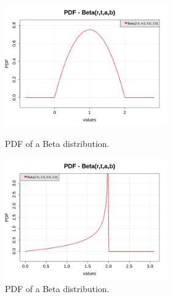 {\begin{itemize}
\begin{figure}[H]
\begin{minipage}{8cm}
\begin{center}
\includegraphics[width=7cm]{Figures/pdf_Beta_3.png}
\caption{PDF of a Beta distribution.}
\end{center}
\end{minipage}
\hfill
\begin{minipage}{8cm}
\begin{center}
\includegraphics[width=7cm]{Figures/pdf_Beta_4.png}
\caption{PDF of a Beta distribution.}
\end{center}
\end{minipage}
\end{figure}



\end{itemize}}
